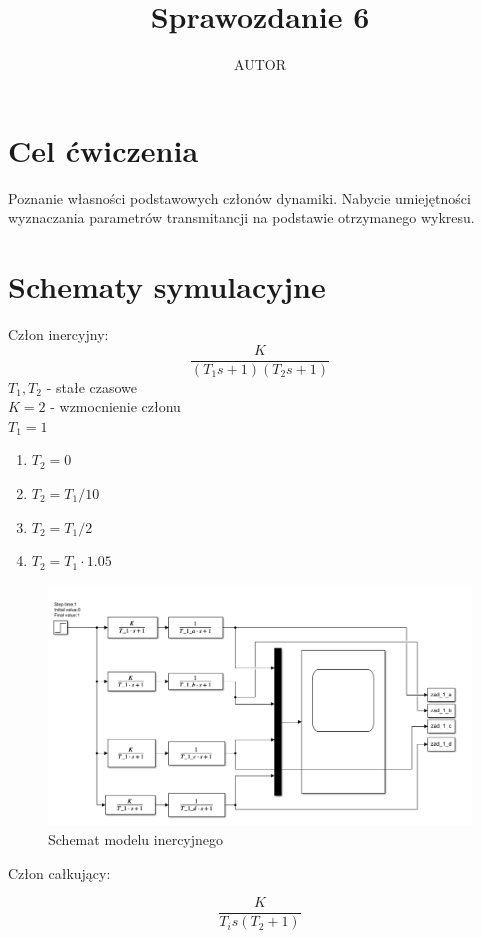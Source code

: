 \documentclass{article}
\title{Sprawozdanie 6}
\author{AUTOR}
\date{}
\begin{document}
\maketitle

\section{Cel ćwiczenia}
Poznanie własności podstawowych członów dynamiki. Nabycie umiejętności wyznaczania parametrów transmitancji na podstawie otrzymanego wykresu.


\section{Schematy symulacyjne}
Człon inercyjny:
$$
\frac{K}{(T_{1}s+1)(T_{2}s+1)}
$$
$T_{1}, T_{2}$ - stałe czasowe\\
$K=2$ - wzmocnienie członu\\
$T_{1}=1$
\begin{enumerate}[label=\alph*)]
\item $T_{2}=0$
\item $T_{2}=T_{1}/10$
\item $T_{2}=T_{1}/2$
\item $T_{2}=T_{1}\cdot 1.05$
\end{enumerate}{}

\begin{figure}[h!]
    \centering
    \includegraphics[scale=0.4]{model_inercyjny.png}
    \caption{Schemat modelu inercyjnego}
    \label{fig:model_inercyjny}
\end{figure}
\newpage
\begin{flushleft}

Człon całkujący:
\end{flushleft}{}
$$
\frac{K}{T_{i}s(T_{2}+1)}
$$
\end{document}
